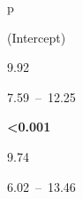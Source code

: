 \documentclass[
  letterpaper,
  DIV=11,
  numbers=noendperiod]{scrartcl}
\begin{document}
\begin{table}
\begin{minipage}[t]{\linewidth}
\end{minipage}%
\newline
\begin{minipage}[t]{\linewidth}

{\centering 

p

}

\end{minipage}%
\newline
\begin{minipage}[t]{\linewidth}

{\centering 

(Intercept)

}

\end{minipage}%
\newline
\begin{minipage}[t]{\linewidth}

{\centering 

9.92

}

\end{minipage}%
\newline
\begin{minipage}[t]{\linewidth}

{\centering 

7.59~--~12.25

}

\end{minipage}%
\newline
\begin{minipage}[t]{\linewidth}

{\centering 

\textbf{\textless0.001}

}

\end{minipage}%
\newline
\begin{minipage}[t]{\linewidth}

{\centering 

9.74

}

\end{minipage}%
\newline
\begin{minipage}[t]{\linewidth}

{\centering 

6.02~--~13.46

}

\end{minipage}%
\newline
\begin{minipage}[t]{\linewidth}


\end{minipage}
\end{table}
\end{document}
